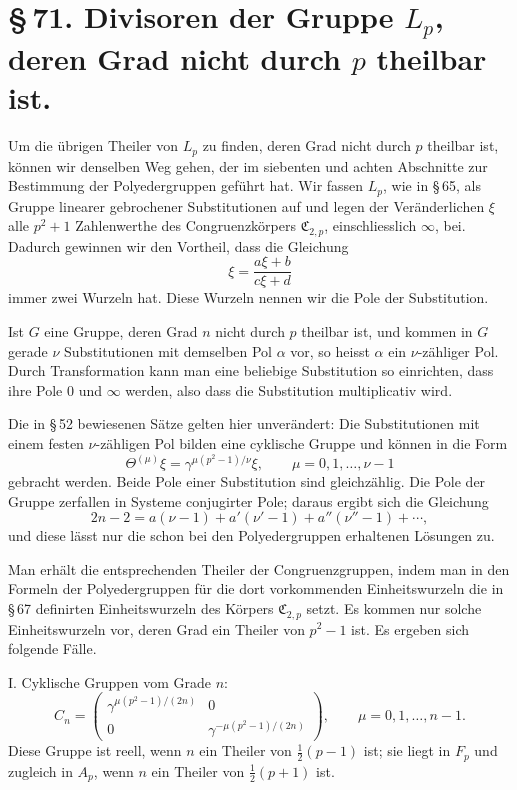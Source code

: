 \documentclass[11pt]{article}
\providecommand{\mat}[4]{\begin{pmatrix}#1&#2\\#3&#4\end{pmatrix}}
\providecommand{\mat}[4]{\begin{pmatrix}#1&#2\\#3&#4\end{pmatrix}}
\providecommand{\Cfield}{\mathfrak C}
\providecommand{\mat}[1]{\begin{pmatrix}#1\end{pmatrix}}
\begin{document}
\section*{\S\,71. Divisoren der Gruppe $L_p$, deren Grad nicht durch $p$ theilbar ist.}

Um die übrigen Theiler von $L_p$ zu finden, deren Grad nicht durch $p$ theilbar ist, können wir denselben Weg gehen, der im siebenten und achten Abschnitte zur Bestimmung der Polyedergruppen geführt hat. Wir fassen $L_p$, wie in \S\,65, als Gruppe linearer gebrochener Substitutionen auf und legen der Veränderlichen $\xi$ alle $p^2+1$ Zahlenwerthe des Congruenzkörpers $\Cfield_{2,p}$, einschliesslich $\infty$, bei. Dadurch gewinnen wir den Vortheil, dass die Gleichung
\begin{equation}
 \xi=\frac{a\xi+b}{c\xi+d}
 \tag{1}
\end{equation}
immer zwei Wurzeln hat. Diese Wurzeln nennen wir die Pole der Substitution.

Ist $G$ eine Gruppe, deren Grad $n$ nicht durch $p$ theilbar ist, und kommen in $G$ gerade $\nu$ Substitutionen mit demselben Pol $\alpha$ vor, so heisst $\alpha$ ein $\nu$-zähliger Pol. Durch Transformation kann man eine beliebige Substitution so einrichten, dass ihre Pole $0$ und $\infty$ werden, also dass die Substitution multiplicativ wird.

Die in \S\,52 bewiesenen Sätze gelten hier unverändert: Die Substitutionen mit einem festen $\nu$-zähligen Pol bilden eine cyklische Gruppe und können in die Form
\begin{equation}
 \Theta^{(\mu)}\xi=\gamma^{\mu(p^2-1)/\nu}\xi,
 \qquad \mu=0,1,\ldots,\nu-1
 \tag{2}
\end{equation}
gebracht werden. Beide Pole einer Substitution sind gleichzählig. Die Pole der Gruppe zerfallen in Systeme conjugirter Pole; daraus ergibt sich die Gleichung
\begin{equation}
 2n-2=a(\nu-1)+a'(\nu'-1)+a''(\nu''-1)+\cdots,
 \tag{3}
\end{equation}
und diese lässt nur die schon bei den Polyedergruppen erhaltenen Lösungen zu.

Man erhält die entsprechenden Theiler der Congruenzgruppen, indem man in den Formeln der Polyedergruppen für die dort vorkommenden Einheitswurzeln die in \S\,67 definirten Einheitswurzeln des Körpers $\Cfield_{2,p}$ setzt. Es kommen nur solche Einheitswurzeln vor, deren Grad ein Theiler von $p^2-1$ ist. Es ergeben sich folgende Fälle.

I. Cyklische Gruppen vom Grade $n$:
\begin{equation}
 C_n=\mat{\gamma^{\mu(p^2-1)/(2n)}}{0}{0}{\gamma^{-\mu(p^2-1)/(2n)}},
 \qquad \mu=0,1,\ldots,n-1.
 \tag{4}
\end{equation}
Diese Gruppe ist reell, wenn $n$ ein Theiler von $\frac12(p-1)$ ist; sie liegt in $F_p$ und zugleich in $A_p$, wenn $n$ ein Theiler von $\frac12(p+1)$ ist.
\end{document}
